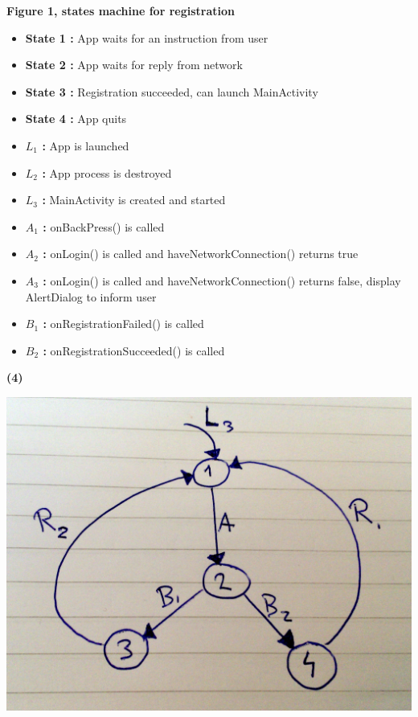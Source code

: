 \documentclass[11pt]{article}
\renewcommand\part[1]{\vspace{.10in}\textbf{(#1)}}
\begin{document}
\textbf{Figure 1, states machine for registration}

\begin{itemize}
	\item \textbf{State 1 : } App waits for an instruction from user
	\item \textbf{State 2 : } App waits for reply from network
	\item \textbf{State 3 : } Registration succeeded, can launch MainActivity
	\item \textbf{State 4 : } App quits
	\item \textbf{$L_{1}$ : } App is launched
	\item \textbf{$L_{2}$ : } App process is destroyed
	\item \textbf{$L_{3}$ : } MainActivity is created and started
	\item \textbf{$A_{1}$ : } onBackPress() is called
	\item \textbf{$A_{2}$ : } onLogin() is called and haveNetworkConnection() returns true
	\item \textbf{$A_{3}$ : } onLogin() is called and haveNetworkConnection() returns false, display AlertDialog to inform user
	\item \textbf{$B_{1}$ : } onRegistrationFailed() is called
	\item \textbf{$B_{2}$ : } onRegistrationSucceeded() is called
\end{itemize}

\clearpage

\part{4}

\includegraphics[scale=0.15]{sendMessageStates.jpg}
\end{document}
